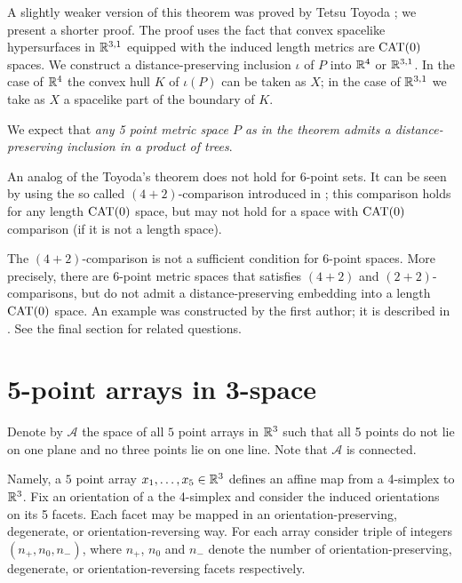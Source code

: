 \documentclass{article}
\begin{document}
A slightly weaker version of this theorem was proved by Tetsu Toyoda \cite{toyoda};
we present a shorter proof.
The proof uses the fact that convex spacelike hypersurfaces in $\mathbb{R}^{3,1}$ equipped with the induced length metrics are $\mathrm{CAT}(0)$ spaces.
We construct a distance-preserving inclusion $\iota$ of $P$ into $\mathbb{R}^4$ or $\mathbb{R}^{3,1}$.
In the case of $\mathbb{R}^4$ the convex hull $K$ of $\iota(P)$ can be taken as $X$;
in the case of $\mathbb{R}^{3,1}$ we take as $X$ a spacelike part of the boundary of $K$.

We expect that \emph{any 5 point metric space $P$ as in the theorem admits a distance-preserving inclusion in a product of trees}.

An analog of the Toyoda's theorem does not hold for 6-point sets.
It can be seen by using the so called $(4{+}2)$-comparison introduced in \cite{alexander-kapovitch-petrunin-2011};
this comparison holds for any length $\mathrm{CAT}(0)$ space, but may not hold for a space with $\mathrm{CAT}(0)$ comparison (if it is not a length space).

{\sloppy

The $(4{+}2)$-comparison is not a sufficient condition for $6$-point spaces.
More precisely, there are 6-point metric spaces that satisfies $(4{+}2)$ and $(2{+}2)$-comparisons, but do not admit a distance-preserving embedding into a length $\mathrm{CAT}(0)$ space.
An example was constructed by the first author; it is described in \cite{alexander-kapovitch-petrunin-2011}.
See the final section for related questions.

}

\section{5-point arrays in 3-space}

Denote by $\mathcal{A}$ the space of all $5$ point arrays in $\mathbb{R}^3$ such that all 5 points do not lie on one plane and no three points lie on one line.
Note that $\mathcal{A}$ is connected.

Namely, a $5$ point array  $x_1,\dots,x_5\in \mathbb{R}^3$ defines an affine map from a 4-simplex to $\mathbb{R}^3$.
Fix an orientation of a the 4-simplex and consider the induced orientations on its 5 facets.
Each facet may be mapped in an orientation-preserving, degenerate, or orientation-reversing way.
For each array consider triple of integers $(n_+, n_0,n_-)$,
where $n_+$, $n_0$ and $n_-$ denote the number of orientation-preserving, degenerate, or orientation-reversing facets respectively.
\end{document}
